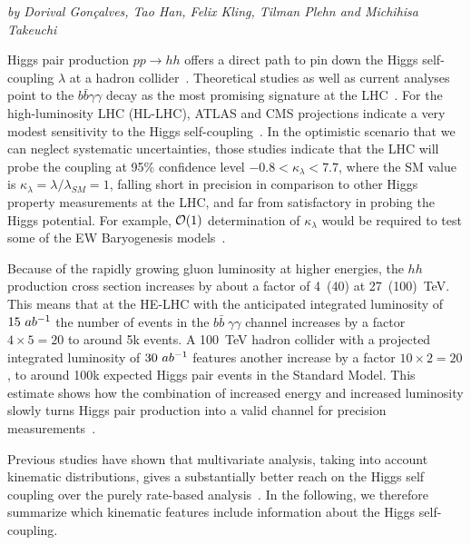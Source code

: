 \begin{center}
\textit{by Dorival Gon\c{c}alves, Tao Han, Felix Kling, Tilman Plehn and Michihisa Takeuchi}
\end{center}

\label{sec:THanetal}

Higgs pair production $pp\rightarrow hh$ offers a direct path to pin
down the Higgs self-coupling $\lambda$ at a hadron collider~\cite{Eboli:1987dy, Dicus:1987ic, Glover:183945, Plehn:1996wb, Djouadi:1999rca, Li:2013rra}.  
Theoretical studies as well as current analyses
point to the $b\bar{b}\gamma\gamma$ decay as the most promising
signature at the LHC~\cite{ATLAS-CONF-2016-004, Aad:2015xja}. 
For the high-luminosity LHC (HL-LHC),
ATLAS and CMS projections indicate a very modest sensitivity to the
Higgs self-coupling~\cite{ATL-PHYS-PUB-2017-001, CMS-PAS-FTR-16-002}. 
In the optimistic scenario that we can neglect systematic
uncertainties, those studies indicate that the LHC will probe the
coupling at 95\% confidence level $-0.8 < \kappa_\lambda < 7.7$, where the SM value is $\kappa_\lambda = \lambda/\lambda_{SM}=1$, 
falling short in precision in comparison to other Higgs 
property measurements at the LHC, and far from satisfactory in probing the
Higgs potential. For example, ${\cal O}(1)$ determination of $\kappa_\lambda$ would be required to 
test some of the EW Baryogenesis models~\cite{Kobakhidze:2015xlz, Chen:2017qcz, Gan:2017mcv, Cao:2017oez, Jain:2017sqm, deVries:2017ncy, Reichert:2017puo, Carena:2018vpt}.

Because of the rapidly growing gluon luminosity at higher energies,
the $hh$ production cross section increases by about a factor of
4~(40) at 27~(100)~TeV.  This means that at the HE-LHC with the
anticipated integrated luminosity of $15~ab^{-1}$ the number of events in
the $b\bar{b} \; \gamma \gamma$ channel increases by a factor $4
\times 5 = 20$ to around 5k events.  A 100~TeV hadron collider with
a projected integrated luminosity of $30~ab^{-1}$ features another
increase by a factor $10 \times 2=20$, to around 100k expected Higgs
pair events in the Standard Model.
This estimate shows how the combination of increased energy and
increased luminosity slowly turns Higgs pair production into a valid
channel for precision measurements~\cite{Goncalves:2018yva}. 


Previous studies have shown that multivariate analysis, taking into 
account kinematic distributions, gives a substantially better reach 
on the Higgs self coupling over the purely rate-based 
analysis~\cite{Goncalves:2018yva,Kling:2016lay,Barger:2014qva,Bauer:2017cov}. In the following, we therefore 
summarize which kinematic features include information about the 
Higgs self-coupling. 

